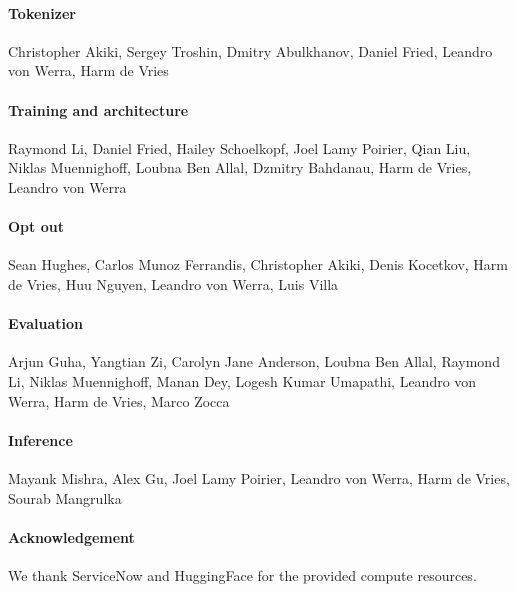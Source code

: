 \documentclass[10pt]{article} \usepackage{iclr2023_conference,times}
\begin{document}
\paragraph{Tokenizer} Christopher Akiki, Sergey Troshin, Dmitry Abulkhanov, Daniel Fried, Leandro von Werra, Harm de Vries

\paragraph{Training and architecture}
Raymond Li, Daniel Fried, Hailey Schoelkopf, Joel Lamy Poirier, Qian Liu, Niklas Muennighoff, Loubna Ben Allal, Dzmitry Bahdanau, Harm de Vries, Leandro von Werra

\paragraph{Opt out}
Sean Hughes, Carlos Munoz Ferrandis, Christopher Akiki, Denis Kocetkov, Harm de Vries, Huu Nguyen, Leandro von Werra, Luis Villa

\paragraph{Evaluation}
Arjun Guha, Yangtian Zi, Carolyn Jane Anderson, Loubna Ben Allal, Raymond Li, Niklas Muennighoff, Manan Dey, Logesh Kumar Umapathi, Leandro von Werra, Harm de Vries, Marco Zocca

\paragraph{Inference}
Mayank Mishra, Alex Gu, Joel Lamy Poirier, Leandro von Werra, Harm de Vries, Sourab Mangrulka

\paragraph{Acknowledgement}
We thank ServiceNow and HuggingFace for the provided compute resources. 




\appendix
\end{document}
